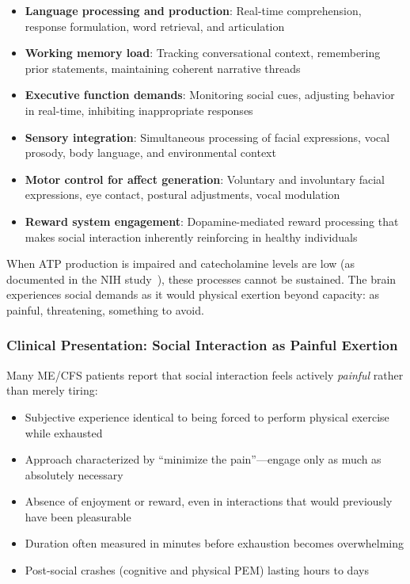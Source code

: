 \begin{itemize}
    \item \textbf{Language processing and production}: Real-time comprehension, response formulation, word retrieval, and articulation
    \item \textbf{Working memory load}: Tracking conversational context, remembering prior statements, maintaining coherent narrative threads
    \item \textbf{Executive function demands}: Monitoring social cues, adjusting behavior in real-time, inhibiting inappropriate responses
    \item \textbf{Sensory integration}: Simultaneous processing of facial expressions, vocal prosody, body language, and environmental context
    \item \textbf{Motor control for affect generation}: Voluntary and involuntary facial expressions, eye contact, postural adjustments, vocal modulation
    \item \textbf{Reward system engagement}: Dopamine-mediated reward processing that makes social interaction inherently reinforcing in healthy individuals
\end{itemize}

When ATP production is impaired and catecholamine levels are low (as documented in the NIH study~\cite{walitt2024deep}), these processes cannot be sustained. The brain experiences social demands as it would physical exertion beyond capacity: as painful, threatening, something to avoid.

\subsubsection{Clinical Presentation: Social Interaction as Painful Exertion}

Many ME/CFS patients report that social interaction feels actively \textit{painful} rather than merely tiring:

\begin{itemize}
    \item Subjective experience identical to being forced to perform physical exercise while exhausted
    \item Approach characterized by ``minimize the pain''---engage only as much as absolutely necessary
    \item Absence of enjoyment or reward, even in interactions that would previously have been pleasurable
    \item Duration often measured in minutes before exhaustion becomes overwhelming
    \item Post-social crashes (cognitive and physical PEM) lasting hours to days
\end{itemize}

